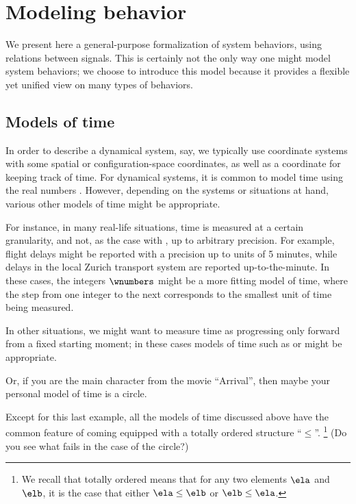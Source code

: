 
\section{Modeling behavior}

We present here a general-purpose formalization of system behaviors, using relations between signals.
This is certainly not the only way one might model system behaviors; we choose to introduce this model because it provides a flexible yet unified view on many types of behaviors.

\subsection{Models of time}

In order to describe a dynamical system, say, we typically use coordinate systems with some spatial or configuration-space coordinates, as well as a coordinate for keeping track of time.
For dynamical systems, it is common to model time using the real numbers \reals.
However, depending on the systems or situations at hand, various other models of time might be appropriate.

For instance, in many real-life situations, time is measured at a certain granularity, and not, as the case with \reals, up to arbitrary precision.
For example, flight delays might be reported with a precision up to units of 5 minutes, while delays in the local Zurich transport system are reported up-to-the-minute.
In these cases, the integers $\wnumbers$ might be a more fitting model of time, where the step from one integer to the next corresponds to the smallest unit of time being measured.

In other situations, we might want to measure time as progressing only forward from a fixed starting moment; in these cases models of time such as \nonNegReals or \natnumbers might be appropriate.

Or, if you are the main character from the movie ``Arrival'', then maybe your personal model of time is a circle.


Except for this last example, all the models of time discussed above have the common feature of coming equipped with a totally ordered  structure ``$\leq$''.
\footnote{We recall that totally ordered means that for any two elements $\ela$ and $\elb$, it is the case that either $\ela \leq \elb$ or $\elb \leq \ela$.}  (Do you see what fails in the case of the circle?)

